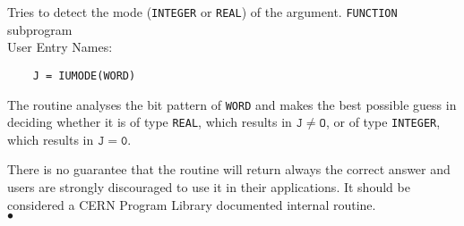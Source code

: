                              
                                    
\Submitter{}                                    
          
\begin{center}
\end{center}
Tries to detect the mode ({\tt INTEGER} or {\tt REAL}) of the argument.
\Structure
{\tt FUNCTION} subprogram \\
User Entry Names: 
\Usage
\begin{verbatim}
    J = IUMODE(WORD)
\end{verbatim}
The routine analyses the bit pattern of {\tt WORD} and makes the best
possible guess in deciding whether it is of type {\tt REAL}, which
results in $\mathtt{J \neq O}$, or of type {\tt INTEGER}, which results in
$\mathtt{J=0}$.
\par
There is no guarantee that the routine will return always the correct
answer and users are strongly discouraged to use it in their
applications. It should be considered a CERN Program Library documented
internal routine.
\\ $\bullet$
